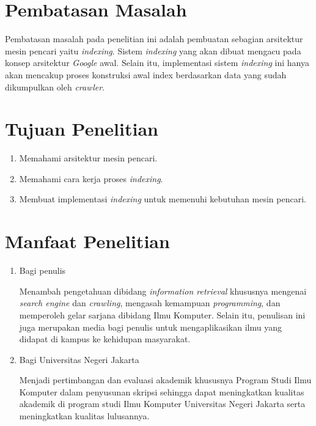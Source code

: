 \section{Pembatasan Masalah}
Pembatasan masalah pada penelitian ini adalah pembuatan sebagian arsitektur
mesin pencari yaitu \emph{indexing}. Sistem \emph{indexing} yang akan dibuat
mengacu pada konsep arsitektur \emph{Google} awal. Selain itu, implementasi
sistem \textit{indexing} ini hanya akan mencakup proses konstruksi awal index
berdasarkan data yang sudah dikumpulkan oleh \textit{crawler}.

\section{Tujuan Penelitian}
\begin{enumerate}
	\item Memahami arsitektur mesin pencari.
	\item Memahami cara kerja proses \emph{indexing}.
	\item Membuat implementasi \emph{indexing} untuk memenuhi kebutuhan mesin
		pencari.
\end{enumerate}

\section{Manfaat Penelitian}
\begin{enumerate}
	\item Bagi penulis
		
	Menambah pengetahuan dibidang \emph{information retrieval} khususnya mengenai
		\emph{search engine} dan \emph{crawling}, mengasah kemampuan
		\emph{programming}, dan memperoleh gelar sarjana dibidang Ilmu Komputer.
		Selain itu, penulisan ini juga merupakan media bagi penulis untuk
		mengaplikasikan ilmu yang didapat di kampus ke kehidupan masyarakat.
		
	\item Bagi Universitas Negeri Jakarta
	
	Menjadi pertimbangan dan evaluasi akademik khususnya Program Studi Ilmu
		Komputer dalam penyusunan skripsi sehingga dapat meningkatkan kualitas
		akademik di program studi Ilmu Komputer Universitas Negeri Jakarta serta
		meningkatkan kualitas lulusannya.
			
\end{enumerate}

\begin{comment}

\end{comment}
